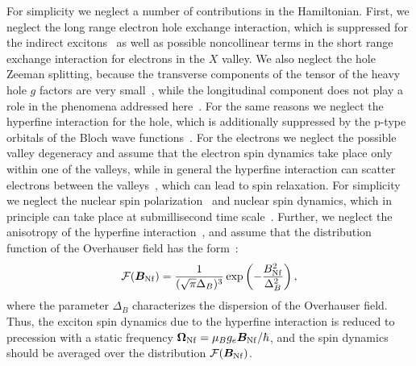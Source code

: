 \documentclass[twocolumn,showpacs,preprintnumbers,amsmath,amssymb,aps]{revtex4-1}
\begin{document}
For simplicity we neglect a number of contributions in the
Hamiltonian. First, we neglect the long range electron hole exchange
interaction, which is suppressed for the indirect
excitons~\cite{Bir,Goupalov,Kuznetsova} as well as possible
noncollinear terms in the short range exchange interaction for electrons in the $X$ valley. We also neglect the hole Zeeman splitting, because the transverse components
of the tensor of the heavy hole $g$ factors are very
small~\cite{Debus,Golub}, while the longitudinal component does not
play a role in the phenomena addressed here~\cite{Smirnov125}.
For the same reasons we neglect the
hyperfine interaction for the hole, which is additionally suppressed by
the p-type orbitals of the Bloch wave functions~\cite{Glazov,Chekhovich}. For
the electrons we neglect the possible valley degeneracy and assume
that the electron spin dynamics take place only within one of the
valleys, while in general the hyperfine interaction can scatter
electrons between the valleys~\cite{Avdeev}, which can lead to
spin relaxation. For simplicity we neglect the nuclear spin
polarization~\cite{OO_book,Korenev} and nuclear spin dynamics, which
in principle can take place at submillisecond time
scale~\cite{Petrov,Inertia,CSM}. Further, we neglect the anisotropy
of the hyperfine interaction~\cite{Shchepetilnikov,Kuznetsova}, and
assume that the distribution function of the Overhauser field has
the form~\cite{Merkulov,PRC_general}:
\begin{equation}
  \mathcal F({\bm B}_{\rm Nf}) = \frac{1}{(\sqrt{\pi}\Delta_B)^{3}}\exp\left(-\frac{{B}_{\rm Nf}^2}{\Delta_B^2}\right),
\end{equation}
where the parameter $\Delta_B$ characterizes the dispersion of the
Overhauser field. Thus, the exciton spin dynamics due to the
hyperfine interaction is reduced to precession with a static
frequency $\bm{\Omega}_{\rm Nf} = \mu_B g_e {\bm B}_{\rm Nf} /\hbar
$, and the spin dynamics should be averaged over the distribution
$\mathcal F({\bm B}_{\rm Nf})$.
\end{document}
